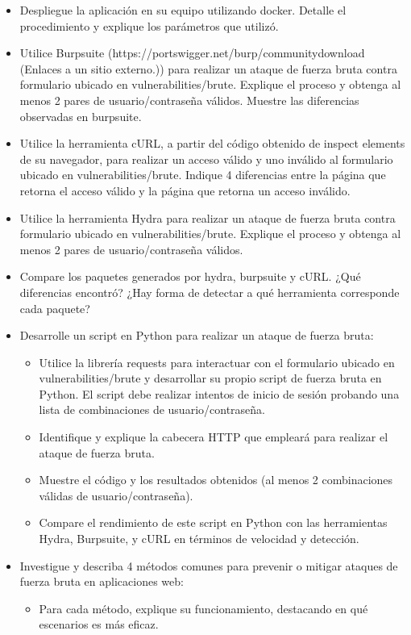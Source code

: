 \documentclass[letter,12pt]{article}
\begin{document}
\begin{itemize}
    \item Despliegue la aplicación en su equipo utilizando docker. Detalle el procedimiento y explique los parámetros que utilizó.
    \item Utilice Burpsuite (https://portswigger.net/burp/communitydownload (Enlaces a un sitio externo.)) para realizar un ataque de fuerza bruta contra formulario ubicado en vulnerabilities/brute. Explique el proceso y obtenga al menos 2 pares de usuario/contraseña válidos. Muestre las diferencias observadas en burpsuite.
    \item Utilice la herramienta cURL, a partir del código obtenido de inspect elements de su navegador, para realizar un acceso válido y uno inválido al formulario ubicado en vulnerabilities/brute. Indique 4 diferencias entre la página que retorna el acceso válido y la página que retorna un acceso inválido.
    \item Utilice la herramienta Hydra para realizar un ataque de fuerza bruta contra formulario ubicado en vulnerabilities/brute. Explique el proceso y obtenga al menos 2 pares de usuario/contraseña válidos.
    \item Compare los paquetes generados por hydra, burpsuite y cURL. ¿Qué diferencias encontró? ¿Hay forma de detectar a qué herramienta corresponde cada paquete?

    \item Desarrolle un script en Python para realizar un ataque de fuerza bruta:

    \begin{itemize}
        \item Utilice la librería requests para interactuar con el formulario ubicado en vulnerabilities/brute y desarrollar su propio script de fuerza bruta en Python.
        El script debe realizar intentos de inicio de sesión probando una lista de combinaciones de usuario/contraseña.

        \item  Identifique y explique la cabecera HTTP que empleará para realizar el ataque de fuerza bruta.

        \item  Muestre el código y los resultados obtenidos (al menos 2 combinaciones válidas de usuario/contraseña).

        \item Compare el rendimiento de este script en Python con las herramientas Hydra, Burpsuite, y cURL en términos de velocidad y detección.
    \end{itemize}

    \item  Investigue y describa 4 métodos comunes para prevenir o mitigar ataques de fuerza bruta en aplicaciones web:

    \begin{itemize}
        \item Para cada método, explique su funcionamiento, destacando en qué escenarios es más eficaz.

    \end{itemize}


    
\end{itemize}
\end{document}
